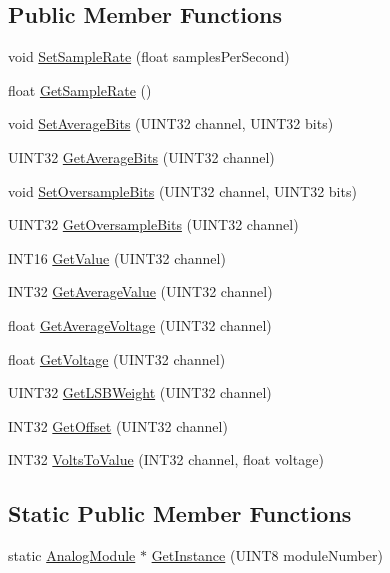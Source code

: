 \subsection*{Public Member Functions}
\begin{DoxyCompactItemize}
\item 
void \hyperlink{classAnalogModule_a19bfb0c8ddf33573c4da105bee04b951}{SetSampleRate} (float samplesPerSecond)
\item 
float \hyperlink{classAnalogModule_ab063044c14383369726b80ce93c334be}{GetSampleRate} ()
\item 
void \hyperlink{classAnalogModule_a7c7f2eade6ca95f337d394c89f7f9da5}{SetAverageBits} (UINT32 channel, UINT32 bits)
\item 
UINT32 \hyperlink{classAnalogModule_a5b5a1104a3415b5960d521f402b68f91}{GetAverageBits} (UINT32 channel)
\item 
void \hyperlink{classAnalogModule_a556054af12905bd3d38972d15ecd08dc}{SetOversampleBits} (UINT32 channel, UINT32 bits)
\item 
UINT32 \hyperlink{classAnalogModule_acf3aa82998c5f22099a79d24f6c77861}{GetOversampleBits} (UINT32 channel)
\item 
INT16 \hyperlink{classAnalogModule_a23f1793a4408e824b7d6b38295ea8be1}{GetValue} (UINT32 channel)
\item 
INT32 \hyperlink{classAnalogModule_a501c32dcebccd03057b9f01683431f4b}{GetAverageValue} (UINT32 channel)
\item 
float \hyperlink{classAnalogModule_ae74bde5efa97807ce42ad9834bb5b4b2}{GetAverageVoltage} (UINT32 channel)
\item 
float \hyperlink{classAnalogModule_a4c2875e0c44d93ea110bc3cf4f8d740e}{GetVoltage} (UINT32 channel)
\item 
UINT32 \hyperlink{classAnalogModule_a1cc2b9f90b5abaa42ddfde7cbbbf7d7c}{GetLSBWeight} (UINT32 channel)
\item 
INT32 \hyperlink{classAnalogModule_a3c428c04cb174c95dad6f2cb449b135f}{GetOffset} (UINT32 channel)
\item 
INT32 \hyperlink{classAnalogModule_a4d32e8352879088d4749efec89751313}{VoltsToValue} (INT32 channel, float voltage)
\end{DoxyCompactItemize}
\subsection*{Static Public Member Functions}
\begin{DoxyCompactItemize}
\item 
static \hyperlink{classAnalogModule}{AnalogModule} $\ast$ \hyperlink{classAnalogModule_a73ff2a8a74ce3371d73c701890cc422a}{GetInstance} (UINT8 moduleNumber)
\end{DoxyCompactItemize}
